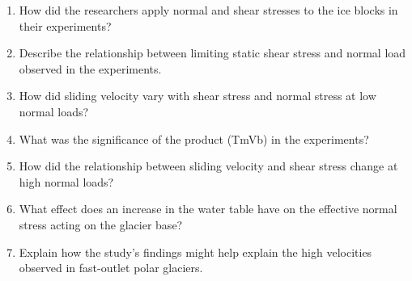 \begin{enumerate}
\item How did the researchers apply normal and shear stresses to the ice blocks in their experiments?

\item Describe the relationship between limiting static shear stress and normal load observed in the experiments.

\item How did sliding velocity vary with shear stress and normal stress at low normal loads? %

\item What was the significance of the product (TmVb) in the experiments?

\item How did the relationship between sliding velocity and shear stress change at high normal loads?


\item What effect does an increase in the water table have on the effective normal stress acting on the glacier base?

\item Explain how the study's findings might help explain the high velocities observed in fast-outlet polar glaciers.


\end{enumerate}
